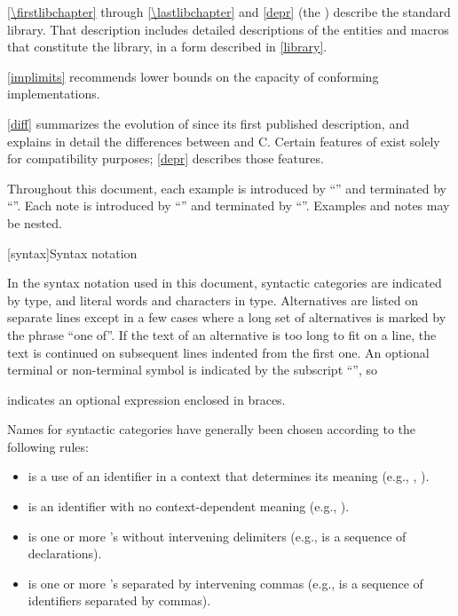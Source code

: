 \pnum
\ref{\firstlibchapter} through \ref{\lastlibchapter} and \ref{depr}
(the ) describe the \Cpp{} standard library.
That description includes detailed descriptions of the
entities and macros
that constitute the library, in a form described in \ref{library}.

\pnum
\ref{implimits} recommends lower bounds on the capacity of conforming
implementations.

\pnum
\ref{diff} summarizes the evolution of \Cpp{} since its first
published description, and explains in detail the differences between
\Cpp{} and C\@. Certain features of \Cpp{} exist solely for compatibility
purposes; \ref{depr} describes those features.

\pnum
Throughout this document, each example is introduced by
``'' and terminated by ``''. Each note is
introduced by ``'' and terminated by ``''. Examples
and notes may be nested.%

[syntax]{Syntax notation}

\pnum
{}%
In the syntax notation used in this document, syntactic
categories are indicated by  type, and literal words
and characters in   type. Alternatives are
listed on separate lines except in a few cases where a long set of
alternatives is marked by the phrase ``one of''. If the text of an alternative is too long to fit on a line, the text is continued on subsequent lines indented from the first one.
An optional terminal or non-terminal symbol is indicated by the subscript
``\opt{\relax}'', so

\begin{ncbnf}
\terminal{\{}  \terminal{\}}
\end{ncbnf}

indicates an optional expression enclosed in braces.%

\pnum
Names for syntactic categories have generally been chosen according to
the following rules:
\begin{itemize}
\item {} is a use of an identifier in a context that
determines its meaning (e.g., ,
).
\item {} is an identifier with no context-dependent meaning
(e.g., ).
\item {} is one or more 's without intervening
delimiters (e.g.,  is a sequence of
declarations).
\item {} is one or more 's separated by
intervening commas (e.g.,  is a sequence of
identifiers separated by commas).
\end{itemize}%

